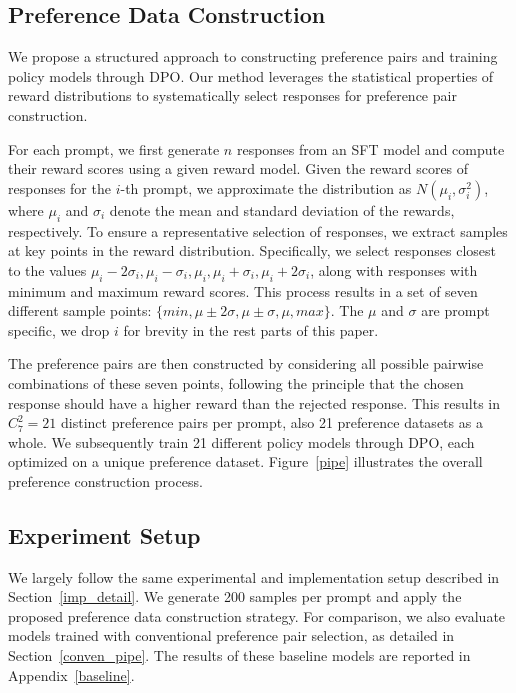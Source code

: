 % 




\subsection{Preference Data Construction}
\label{data_cons}
We propose a structured approach to constructing preference pairs and training policy models through DPO. 
Our method leverages the statistical properties of reward distributions to systematically select responses for preference pair construction.

For each prompt, we first generate \( n \) responses from an SFT model and compute their reward scores using a given reward model. 
Given the reward scores of responses for the \( i \)-th prompt, we approximate the distribution as \( N(\mu_i, \sigma_i^2) \), where \( \mu_i \) and \( \sigma_i \) denote the mean and standard deviation of the rewards, respectively. 
To ensure a representative selection of responses, we extract samples at key points in the reward distribution. 
Specifically, we select responses closest to the values \( \mu_i - 2\sigma_i, \mu_i - \sigma_i, \mu_i, \mu_i + \sigma_i, \mu_i + 2\sigma_i \), along with responses with minimum and maximum reward scores.
This process results in a set of seven different sample points: \( \{ min, \mu \pm 2\sigma, \mu \pm \sigma, \mu, max \} \).
The \(\mu\) and \(\sigma\) are prompt specific, we drop \(i\) for brevity in the rest parts of this paper.

The preference pairs are then constructed by considering all possible pairwise combinations of these seven points, following the principle that the chosen response should have a higher reward than the rejected response. 
This results in \( C_7^2 = 21 \) distinct preference pairs per prompt, also 21 preference datasets as a whole. 
We subsequently train 21 different policy models through DPO, each optimized on a unique preference dataset. 
Figure~\ref{pipe} illustrates the overall preference construction process.

\subsection{Experiment Setup}
We largely follow the same experimental and implementation setup described in Section~\ref{imp_detail}. 
We generate 200 samples per prompt and apply the proposed preference data construction strategy. 
For comparison, we also evaluate models trained with conventional preference pair selection, as detailed in Section~\ref{conven_pipe}. 
The results of these baseline models are reported in Appendix~\ref{baseline}.


